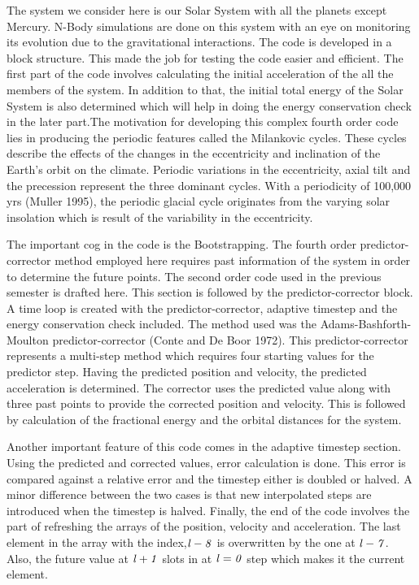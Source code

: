 \documentclass[11pt]{article}
\begin{document}
{\normalsize{
The system we consider here is our Solar System with all the planets except Mercury. N-Body simulations are done on this system with an eye on monitoring its evolution due to the gravitational interactions. The code is developed in a block structure. This made the job for testing the code easier and efficient. The first part of the code involves calculating the initial acceleration of the all the members of the system. In addition to that, the initial total energy of the Solar System is also determined which will help in doing the energy conservation check in the later part.The motivation for developing this complex fourth order code lies in producing the periodic features called the Milankovic cycles. These cycles describe the effects of the changes in the eccentricity and inclination of the Earth's orbit on the climate. Periodic variations in the eccentricity, axial tilt and the precession represent the three dominant cycles. With a periodicity of 100,000 yrs (Muller 1995), the periodic glacial cycle originates from the varying solar insolation which is result of the variability in the eccentricity.

\medskip

The important cog in the code is the Bootstrapping. The fourth order predictor-corrector method employed here requires past information of the system in order to determine the future points. The second order code used in the previous semester is drafted here. This section is followed by the predictor-corrector block. A time loop is created with the predictor-corrector, adaptive timestep and the energy conservation check included. The method used was the Adams-Bashforth-Moulton predictor-corrector (Conte and De Boor 1972). This predictor-corrector represents a multi-step method which requires four starting values for the predictor step. Having the predicted position and velocity, the predicted acceleration is determined. The corrector uses the predicted value along with three past points to provide the corrected position and velocity. This is followed by calculation of the fractional energy and the orbital distances for the system. 

\medskip

Another important feature of this code comes in the adaptive timestep section. Using the predicted and corrected values, error calculation is done. This error is compared against a relative error and the timestep either is doubled or halved. A minor difference between the two cases is that new interpolated steps are introduced when the timestep is halved. Finally, the end of the code involves the part of refreshing the arrays of the position, velocity and acceleration. The last element in the array with the index,${\it l-8}$ is overwritten by the one at ${\it l-7}$. Also, the future value at ${\it l+1}$ slots in at ${\it l=0}$ step which makes it the current element. 

\medskip
 
}}
\end{document}
